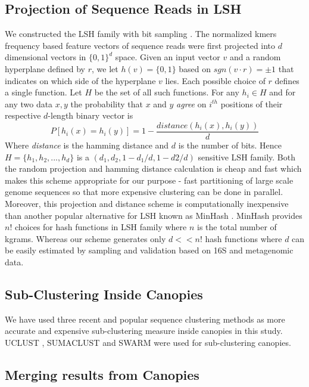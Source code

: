 \documentclass[10pt, conference, compsocconf]{IEEEtran}
\begin{document}
\subsection{\textbf{Projection of Sequence Reads in LSH}}

We constructed the LSH family with bit sampling \cite{indyk1998approximate}. The normalized kmers frequency based feature vectors of sequence reads were first projected into $d$ dimensional vectors in $\{0,1\}^d$ space. Given an input vector $v$ and a random hyperplane defined by $r$, we let $h(v)=\{0,1\}$ based on $sgn(v\cdot{r})=\pm{1}$ that indicates on which side of the hyperplane $v$ lies. Each possible choice of $r$ defines a single function. Let $H$ be the set of all such functions. For any $h_i\in{H}$ and for any two data $x,y$ the probability that $x$ and $y$ \emph{agree} on $i^{th}$ positions of their respective $d$-length binary vector is
\begin{equation}
P[h_i(x)=h_i(y)]=1-\frac{distance(h_i(x),h_i(y))}{d} 
\end{equation}
Where \emph{distance} is the hamming distance and $d$ is the number of bits. Hence $H=\{h_1,h_2,...,h_d\}$ is a $(d_1,d_2,1-d_1/d,1-d2/d)$ sensitive LSH family. Both the random projection and hamming distance calculation is cheap and fast which makes this scheme appropriate for our purpose - fast partitioning of large scale genome sequences so that more expensive clustering can be done in parallel. Moreover, this projection and distance scheme is computationally inexpensive than another popular alternative for LSH known as MinHash \cite{broder1997resemblance}. MinHash provides $n!$ choices for hash functions in LSH family where $n$ is the total number of kgrams. Whereas our scheme generates only $d<<n!$ hash functions where $d$ can be easily estimated by sampling and validation based on 16S and metagenomic data.  

\subsection{\textbf{Sub-Clustering Inside Canopies}}
\label{sub-cluster}
We have used three recent and popular sequence clustering methods as more accurate and expensive sub-clustering measure inside canopies in this study. UCLUST \cite{MARuclust}, SUMACLUST \cite{MARSumaclust} and SWARM \cite{MARSwarm2} were used for sub-clustering canopies.

\subsection{\textbf{Merging results from Canopies}}
\end{document}
